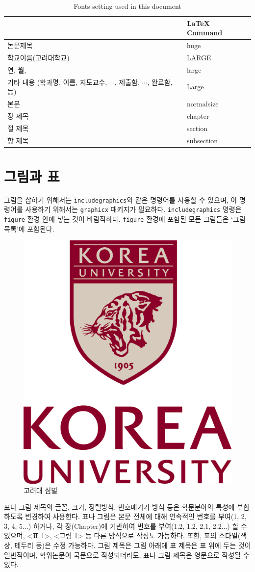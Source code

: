 \documentclass[11pt]{report}
\begin{document}
\begin{table}\centering
\caption{Fonts setting used in this document}
\vspace{0.5cm}
\begin{tabular}{  m{7cm}  m{5cm} }
\toprule 				&     \LaTeX{} Command \\\midrule
논문제목				& huge \\
학교이름(고려대학교)	& LARGE \\
연, 월, 				& large\\
기타 내용 (학과명, 이름, 지도교수, \(\cdots\), 제출함, \(\cdots\), 완료함,등)	& Large\\
본문					& normalsize	\\
장 제목   			& chapter \\
절 제목				& section \\
항 제목				& subsection \\\bottomrule

\end{tabular}
\end{table}



\newpage
\section{그림과 표}\label{sec:figures_and_table}

그림을 삽하기 위해서는 \texttt{includegraphics}와 같은 명령어를 사용할 수 있으며, 이 명령어를 사용하기 위해서는 \texttt{graphicx} 패키지가 필요하다.
\texttt{includegraphics} 명령은 \texttt{figure} 환경 안에 넣는 것이 바람직하다.
\texttt{figure} 환경에 포함된 모든 그림들은 `그림 목록'에 포함된다.

\renewcommand\figurename{그림}
\begin{figure}
\begin{center}
\vspace{0.5cm}
\includegraphics[width=.2\textwidth]{kumark.png}
\end{center}
\caption{고려대 심벌}
\end{figure}

표나 그림 제목의 글꼴, 크기, 정렬방식, 번호매기기 방식 등은 학문분야의 특성에 부합하도록 변경하여 사용한다. 표나 그림은 본문 전체에 대해 연속적인 번호를 부여(1, 2, 3, 4, 5...) 하거나, 각 장(Chapter)에 기반하여 번호를 부여(1.2, 1.2, 2.1, 2.2...) 할 수 있으며, <표 1>, <그림 1> 등 다른 방식으로 작성도 가능하다. 또한, 표의 스타일(색상, 테두리 등)은 수정 가능하다. 그림 제목은 그림 아래에 표 제목은 표 위에 두는 것이 일반적이며, 학위논문이 국문으로 작성되더라도, 표나 그림 제목은 영문으로 작성될 수 있다. \par
\end{document}
